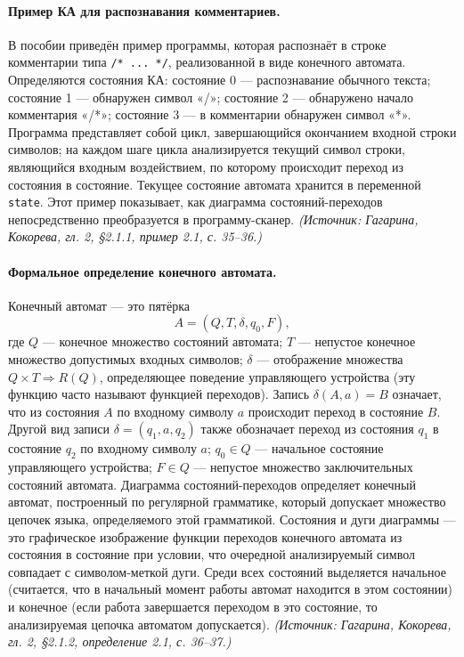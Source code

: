 \documentclass[a4paper,12pt]{article}
\begin{document}
\paragraph{Пример КА для распознавания комментариев.}
В пособии приведён пример программы, которая распознаёт в строке комментарии типа \texttt{/* ... */}, реализованной в виде конечного автомата. Определяются состояния КА: состояние 0 — распознавание обычного текста; состояние 1 — обнаружен символ «/»; состояние 2 — обнаружено начало комментария «/*»; состояние 3 — в комментарии обнаружен символ «*». Программа представляет собой цикл, завершающийся окончанием входной строки символов; на каждом шаге цикла анализируется текущий символ строки, являющийся входным воздействием, по которому происходит переход из состояния в состояние. Текущее состояние автомата хранится в переменной \texttt{state}. Этот пример показывает, как диаграмма состояний-переходов непосредственно преобразуется в программу-сканер.
\textit{(Источник: Гагарина, Кокорева, гл. 2, §2.1.1, пример 2.1, с. 35--36.)}

\paragraph{Формальное определение конечного автомата.}
Конечный автомат — это пятёрка
\[
A=(Q,T,\delta,q_0,F),
\]
где \(Q\) — конечное множество состояний автомата; \(T\) — непустое конечное множество допустимых входных символов; \(\delta\) — отображение множества \(Q\times T\Rightarrow R(Q)\), определяющее поведение управляющего устройства (эту функцию часто называют функцией переходов). Запись \(\delta(A,a)=B\) означает, что из состояния \(A\) по входному символу \(a\) происходит переход в состояние \(B\). Другой вид записи \(\delta=(q_1,a,q_2)\) также обозначает переход из состояния \(q_1\) в состояние \(q_2\) по входному символу \(a\); \(q_0\in Q\) — начальное состояние управляющего устройства; \(F\in Q\) — непустое множество заключительных состояний автомата. Диаграмма состояний-переходов определяет конечный автомат, построенный по регулярной грамматике, который допускает множество цепочек языка, определяемого этой грамматикой. Состояния и дуги диаграммы — это графическое изображение функции переходов конечного автомата из состояния в состояние при условии, что очередной анализируемый символ совпадает с символом-меткой дуги. Среди всех состояний выделяется начальное (считается, что в начальный момент работы автомат находится в этом состоянии) и конечное (если работа завершается переходом в это состояние, то анализируемая цепочка автоматом допускается).
\textit{(Источник: Гагарина, Кокорева, гл. 2, §2.1.2, определение 2.1, с. 36--37.)}
\end{document}
